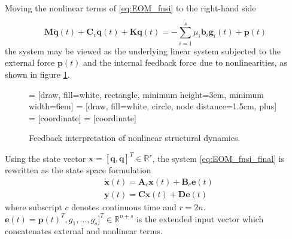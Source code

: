 Moving the nonlinear terms of \eqref{eq:EOM_fnsi} to the right-hand side

\begin{equation}
  \label{eq:EOM_fnsi_final}
  \bm M \ddot{\bm q}(t) + \bm C_v \dot{\bm q}(t) + \bm K \bm q(t) = -
  \sum_{i=1}^s \mu_i \bm b_i \bm g_i(t) + \bm p(t)
\end{equation}
the system may be viewed as the underlying linear system subjected to the
external force $\bm p(t)$ and the internal feedback force due to nonlinearities,
as shown in figure \ref{fig:fnsi_feedback}.

\begin{figure}[!ht]
  \centering
   = [draw, fill=white, rectangle, minimum height=3em, minimum width=6em]
   = [draw, fill=white, circle, node distance=1.5cm, plus]
   = [coordinate]
   = [coordinate]
  \caption{Feedback interpretation of nonlinear structural dynamics.}
  \label{fig:fnsi_feedback}
\end{figure}


Using the state vector $\bm x = [\bm q, \dot{\bm q}]^T\in\mathbb{R}^r$, the
system \eqref{eq:EOM_fnsi_final} is rewritten as the state space formulation
\begin{equation}
  \label{eq:fnsi_c_state_space}
  \begin{split}
    &\dot{\bm x}(t) = \bm A_c \bm x(t) + \bm B_c \bm e(t) \\
    &\bm y(t) = \bm C \bm x(t) + \bm D \bm e(t)
  \end{split}
\end{equation}
where subscript $c$ denotes {\textit continuous time} and $r=2n$. $\bm e(t) =
\bm p(t)^T, g_1, \dots , g_s]^T \in \mathbb{R}^{n+s}$ is the extended input
vector which concatenates external and nonlinear terms.

